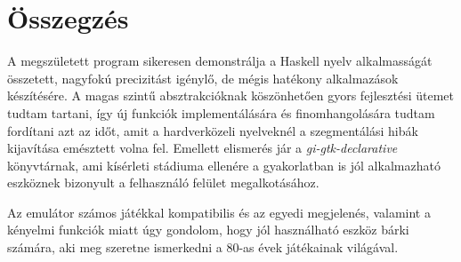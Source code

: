 \chapter{Összegzés} %
\label{ch:sum}

A megszületett program sikeresen demonstrálja a Haskell nyelv alkalmasságát összetett, nagyfokú precizitást igénylő, de mégis hatékony alkalmazások készítésére. A magas szintű absztrakcióknak köszönhetően gyors fejlesztési ütemet tudtam tartani, így új funkciók implementálására és finomhangolására tudtam fordítani azt az időt, amit a hardverközeli nyelveknél a szegmentálási hibák kijavítása emésztett volna fel. Emellett elismerés jár a \emph{gi-gtk-declarative} könyvtárnak, ami kísérleti stádiuma ellenére a gyakorlatban is jól alkalmazható eszköznek bizonyult a felhasználó felület megalkotásához.

Az emulátor számos játékkal kompatibilis és az egyedi megjelenés, valamint a kényelmi funkciók miatt úgy gondolom, hogy jól használható eszköz bárki számára, aki meg szeretne ismerkedni a 80-as évek játékainak világával.

